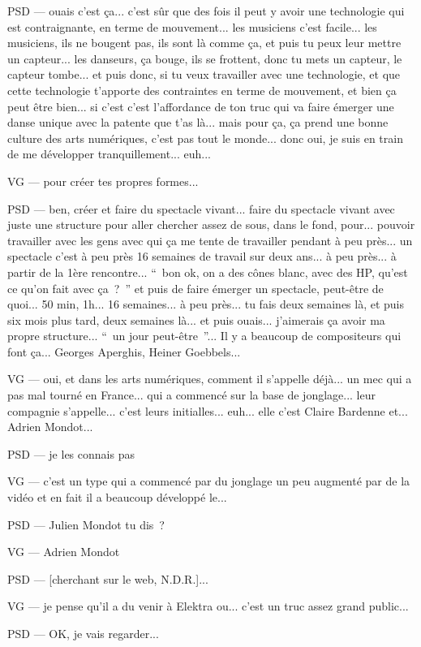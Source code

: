 PSD — ouais c'est ça... c'est sûr que des fois il peut y avoir une technologie qui est contraignante, en terme de mouvement... les musiciens c'est facile... les musiciens, ils ne bougent pas, ils sont là comme ça, et puis  tu peux leur mettre un capteur... les danseurs, ça bouge, ils se frottent, donc tu mets un capteur, le capteur tombe... et puis donc, si tu veux travailler avec une technologie, et que cette technologie t'apporte des contraintes en terme de mouvement, et bien ça peut être bien... si c'est c'est l'affordance de ton truc qui va faire émerger une danse unique avec la patente que t'as là... mais pour ça, ça prend une bonne culture des arts numériques, c'est pas tout le monde... donc oui, je suis en train de me développer tranquillement... euh...

VG — pour créer tes propres formes...

PSD — ben, créer et faire du spectacle vivant... faire du spectacle vivant avec juste une structure pour aller chercher assez de sous, dans le fond, pour... pouvoir travailler avec les gens avec qui ça me tente de travailler pendant à peu près... un spectacle c'est à peu près 16 semaines de travail sur deux ans... à peu près... à partir de la 1ère rencontre... “ bon ok, on a des cônes blanc, avec des HP, qu'est ce qu'on fait avec ça ? ” et puis de faire émerger un spectacle, peut-être de quoi... 50 min, 1h... 16 semaines... à peu près... tu fais deux semaines là,  et puis six mois plus tard, deux semaines là... et puis ouais... j'aimerais ça avoir ma propre structure... “ un jour peut-être ”... Il y a beaucoup de compositeurs qui font ça... Georges Aperghis, Heiner Goebbels...

VG — oui, et dans les arts numériques, comment il s'appelle déjà... un mec qui a pas mal tourné en France... qui a commencé sur la base de jonglage... leur compagnie s'appelle... c'est leurs initialles... euh... elle c'est Claire Bardenne et... Adrien Mondot...

PSD — je les connais pas

VG — c'est un type qui a commencé par du jonglage un peu  augmenté par de la vidéo et en fait il a beaucoup développé le...

PSD — Julien Mondot tu dis ?

VG — Adrien Mondot 

PSD — [cherchant sur le web, N.D.R.]...

VG — je pense qu'il a du venir à Elektra ou... c'est un truc assez grand public...

PSD — OK, je vais regarder...

